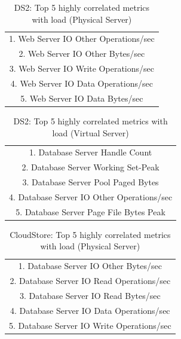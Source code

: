 \begin{table}[thb!]
	\begin{center}
		\caption{DS2: Top 5 highly correlated metrics with load (Physical Server)}
		\label{resultRQ3}
		\begin{tabular}{c}
			\toprule
			1. Web Server IO Other Operations/sec \\
			2. Web Server IO Other Bytes/sec \\
			3. Web Server IO Write Operations/sec \\
			4. Web Server IO Data Operations/sec \\
			5. Web Server IO Data Bytes/sec \\
			
			\bottomrule             
		\end{tabular}
	\end{center}
\end{table}

\begin{table}[thb!]
	\begin{center}
		\caption{DS2: Top 5 highly correlated metrics with load (Virtual Server)}
		\label{resultRQ3}
		\begin{tabular}{c}
			\toprule
			1. Database Server Handle Count \\
			2. Database Server Working Set-Peak \\
			3. Database Server Pool Paged Bytes \\
			4. Database Server IO Other Operations/sec \\
			5. Database Server Page File Bytes Peak \\
			\bottomrule             
		\end{tabular}
	\end{center}
\end{table}

\begin{table}[thb!]
	\begin{center}
		\caption{CloudStore: Top 5 highly correlated metrics with load (Physical Server)}
		\label{resultRQ3}
		\begin{tabular}{c}
			\toprule
			1. Database Server IO Other Bytes/sec  \\
			2. Database Server IO Read Operations/sec   \\
			3. Database Server IO Read Bytes/sec \\
			4. Database Server IO Data Operations/sec    \\
			5. Database Server IO Write Operations/sec \\
			\bottomrule             
		\end{tabular}
	\end{center}
\end{table}


